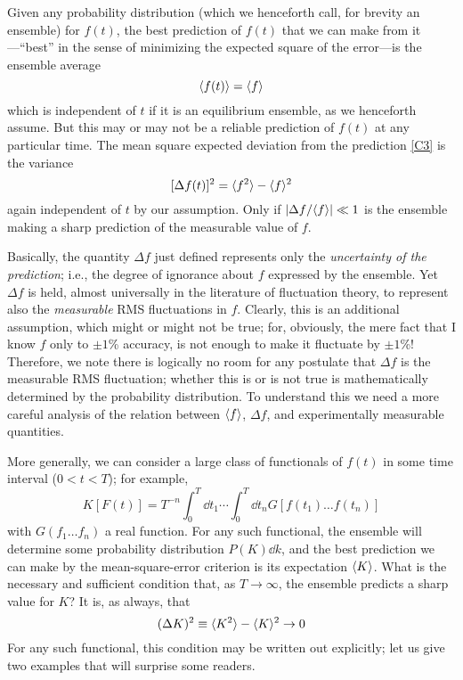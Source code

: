Given any probability distribution (which we henceforth call, for brevity an ensemble) for $f(t)$, the best prediction of $f(t)$ that we can make from it---``best'' in the sense of minimizing the expected square of the error---is the ensemble average
\begin{equation}
	\label{C3}
	\langle f(t)\rangle = \langle f\rangle
\end{equation}
which is independent of $t$ if it is an equilibrium ensemble, as we henceforth assume.
But this may or may not be a reliable prediction of $f(t)$ at any particular time.
The mean square expected deviation from the prediction \eqref{C3} is the variance
\begin{equation}
	\label{C4}
	[\Delta f(t)]^2 = \langle f^2\rangle - \langle f\rangle^2
\end{equation}
again independent of $t$ by our assumption.
Only if $\lvert\Delta f/\langle f\rangle\rvert \ll 1$ is the ensemble making a sharp prediction of the measurable value of $f$.

Basically, the quantity $\Delta f$ just defined represents only the \emph{uncertainty of the prediction}; i.e., the degree of ignorance about $f$ expressed by the ensemble.
Yet $\Delta f$ is held, almost universally in the literature of fluctuation theory, to represent also the \emph{measurable} RMS fluctuations in $f$.
Clearly, this is an additional assumption, which might or might not be true; for, obviously, the mere fact that I know $f$ only to $\pm1$\% accuracy, is not enough to make it fluctuate by $\pm 1$\%!
Therefore, we note there is logically no room for any postulate that $\Delta f$ is the measurable RMS fluctuation; whether this is or is not true is mathematically determined by the probability distribution.
To understand this we need a more careful analysis of the relation between $\langle f\rangle$, $\Delta f$, and experimentally measurable quantities.

More generally, we can consider a large class of functionals of $f(t)$ in some time interval ($0 < t < T$); for example,
\begin{equation}
	\label{C5}
	K[F(t)] = T^{-n} \int_{0}^{T} \dd t_1 \cdots \int_{0}^{T} \dd t_n G[f(t_1)\ldots f(t_n)]
\end{equation}
with $G(f_1\ldots f_n)$ a real function.
For any such functional, the ensemble will determine some probability distribution $P(K)\dd k$, and the best prediction we can make by the mean-square-error criterion is its expectation $\langle K\rangle$.
What is the necessary and sufficient condition that, as $T\to\infty$, the ensemble predicts a sharp value for $K$?
It is, as always, that
\begin{equation}
	\label{C6}
	(\Delta K)^2 \equiv \langle K^2\rangle - \langle K\rangle^2 \to 0
\end{equation}
For any such functional, this condition may be written out explicitly; let us give two examples that will surprise some readers.

